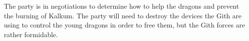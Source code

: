The party is in negotiations to determine how to help the dragons and prevent the burning of Kalkum.
The party will need to destroy the devices the Gith are using to control the young dragons in order to free them, but the Gith forces are rather formidable.
